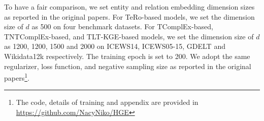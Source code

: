 \documentclass[letterpaper]{article} %
\begin{document}
To have a fair comparison, we set entity and relation embedding dimension sizes as reported in the original papers. For TeRo-based models, we set the dimension size of $d$ as 500 on four benchmark datasets. For TComplEx-based, TNTComplEx-based, and TLT-KGE-based models, we set the dimension size of $d$ as 1200, 1200, 1500 and 2000 on ICEWS14, ICEWS05-15, GDELT and Wikidata12k respectively. The training epoch is set to 200. We adopt the same regularizer, loss function, and negative sampling size as reported in the original papers\footnote{The code, details of training and appendix are provided in \url{https://github.com/NacyNiko/HGE}}.
\end{document}
